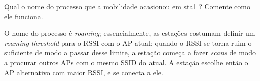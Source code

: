 \documentclass{article}
\begin{document}
\begin{tcolorbox}
    Qual o nome do processo que a mobilidade ocasionou em sta1 ? Comente como ele funciona.
\end{tcolorbox}

O nome do processo é \textit{roaming}; essencialmente,
as estações costumam definir um \textit{roaming threshold}
para o RSSI com o AP atual; quando o RSSI se torna ruim
o suficiente de modo a passar desse limite, a estação começa
a fazer \textit{scans} de modo a procurar outros APs com
o mesmo SSID do atual. A estação escolhe então o AP
alternativo com maior RSSI, e se conecta a ele.
\end{document}
